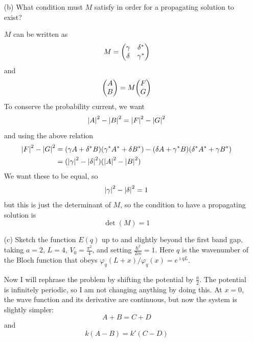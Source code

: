 \documentclass[a4paper,twoside]{article}
\begin{document}
\begin{itemize}
    \item[(b)] What condition must $ M $ satisfy in order for a propagating solution to exist?
        \begin{problem}
            $ M $ can be written as
            \begin{equation}
                M = \mqty(\gamma & \delta^* \\ \delta & \gamma^*)
            \end{equation}
            and
            \begin{equation}
                \mqty(A \\ B) = M \mqty(F \\ G)
            \end{equation}
            To conserve the probability current, we want
            \begin{equation}
                \abs{A}^2 - \abs{B}^2 = \abs{F}^2 - \abs{G}^2
            \end{equation}
            and using the above relation
            \begin{align}
                \abs{F}^2 - \abs{G}^2 &= (\gamma A + \delta^* B)(\gamma^* A^* + \delta B^*) - (\delta A + \gamma^* B)(\delta^* A^* + \gamma B^*) \\
                &= (\abs{\gamma}^2 - \abs{\delta}^2)(\abs{A}^2 - \abs{B}^2)
            \end{align}
            We want these to be equal, so
            \begin{equation}
                \abs{\gamma}^2 - \abs{\delta}^2 = 1
            \end{equation}
            but this is just the determinant of $ M $, so the condition to have a propagating solution is
            \begin{equation}
                \det(M) = 1
            \end{equation}
        \end{problem}
    \item[(c)] Sketch the function $ E(q) $ up to and slightly beyond the first band gap, taking $ a=2 $, $ L = 4 $, $ V_0 = \frac{\pi^2}{4} $, and setting $ \frac{\hbar^2}{2m} = 1 $. Here $ q $ is the wavenumber of the Bloch function that obeys $ \varphi_q(L + x) / \varphi_q(x) = e^{\imath q L} $.
        \begin{problem}
            Now I will rephrase the problem by shifting the potential by $ \frac{a}{2} $. The potential is infinitely periodic, so I am not changing anything by doing this. At $ x = 0 $, the wave function and its derivative are continuous, but now the system is slightly simpler:
            \begin{equation}
                A + B = C + D
            \end{equation}
            and
            \begin{equation}
                k(A-B) = k'(C-D)
            \end{equation}
            

\end{problem}
\end{itemize}
\end{document}
